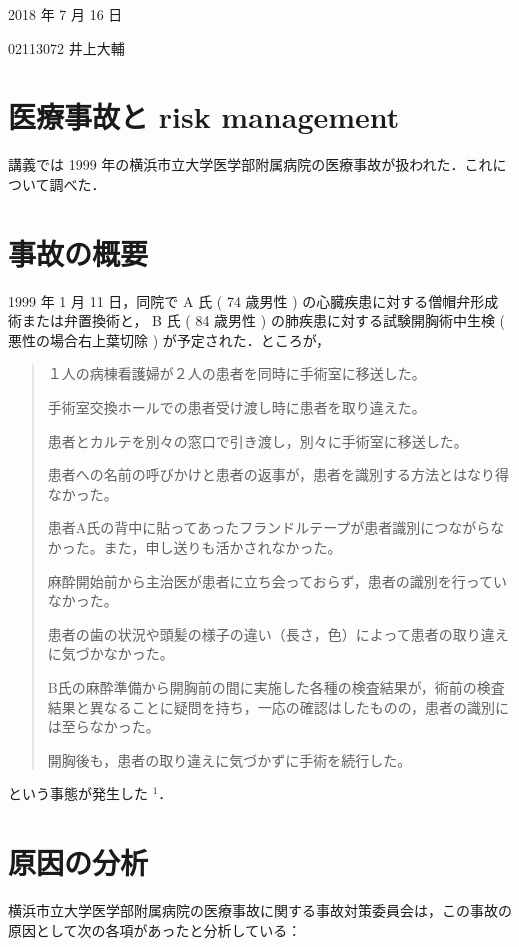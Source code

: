 \documentclass[11pt,dvipdfmx,uplatex]{jsarticle}
\begin{document}
2018 年 7 月 16 日

02113072 井上大輔

\section*{医療事故と risk management}

講義では 1999 年の横浜市立大学医学部附属病院の医療事故が扱われた．これについて調べた．

\section{事故の概要}

1999 年 1 月 11 日，同院で A 氏 ( 74 歳男性 ) の心臓疾患に対する僧帽弁形成術または弁置換術と， B 氏 ( 84 歳男性 ) の肺疾患に対する試験開胸術中生検 ( 悪性の場合右上葉切除 ) が予定された．ところが，

\begin{quote}
    １人の病棟看護婦が２人の患者を同時に手術室に移送した。

    手術室交換ホールでの患者受け渡し時に患者を取り違えた。

    患者とカルテを別々の窓口で引き渡し，別々に手術室に移送した。

    患者への名前の呼びかけと患者の返事が，患者を識別する方法とはなり得なかった。

    患者A氏の背中に貼ってあったフランドルテープが患者識別につながらなかった。また，申し送りも活かされなかった。

    麻酔開始前から主治医が患者に立ち会っておらず，患者の識別を行っていなかった。

    患者の歯の状況や頭髪の様子の違い（長さ，色）によって患者の取り違えに気づかなかった。

    B氏の麻酔準備から開胸前の間に実施した各種の検査結果が，術前の検査結果と異なることに疑問を持ち，一応の確認はしたものの，患者の識別には至らなかった。

    開胸後も，患者の取り違えに気づかずに手術を続行した。 

\end{quote}

という事態が発生した $^1$．

\section{原因の分析}

横浜市立大学医学部附属病院の医療事故に関する事故対策委員会は，この事故の原因として次の各項があったと分析している：
\end{document}
